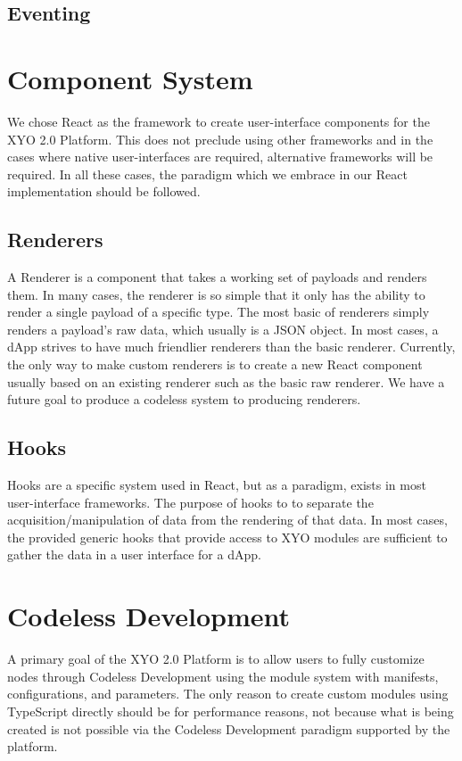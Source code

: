 \documentclass{article}
\begin{document}
\subsection{Eventing}

\section{Component System}
We chose React as the framework to create user-interface components for the XYO 2.0 Platform.  This does not preclude using other frameworks and in the cases where native user-interfaces are required, alternative frameworks will be required.  In all these cases, the paradigm which we embrace in our React implementation should be followed.

\subsection{Renderers}
A Renderer is a component that takes a working set of payloads and renders them.  In many cases, the renderer is so simple that it only has the ability to render a single payload of a specific type.  The most basic of renderers simply renders a payload's raw data, which usually is a JSON object.  In most cases, a dApp strives to have much friendlier renderers than the basic renderer.  Currently, the only way to make custom renderers is to create a new React component usually based on an existing renderer such as the basic raw renderer.  We have a future goal to produce a codeless system to producing renderers.   

\subsection{Hooks}

Hooks are a specific system used in React, but as a paradigm, exists in most user-interface frameworks.  The purpose of hooks to to separate the acquisition/manipulation of data from the rendering of that data.  In most cases, the provided generic hooks that provide access to XYO modules are sufficient to gather the data in a user interface for a dApp.

\section {Codeless Development}
A primary goal of the XYO 2.0 Platform is to allow users to fully customize nodes through Codeless Development using the module system with manifests, configurations, and parameters. The only reason to create custom modules using TypeScript directly should be for performance reasons, not because what is being created is not possible via the Codeless Development paradigm supported by the platform.
\end{document}
